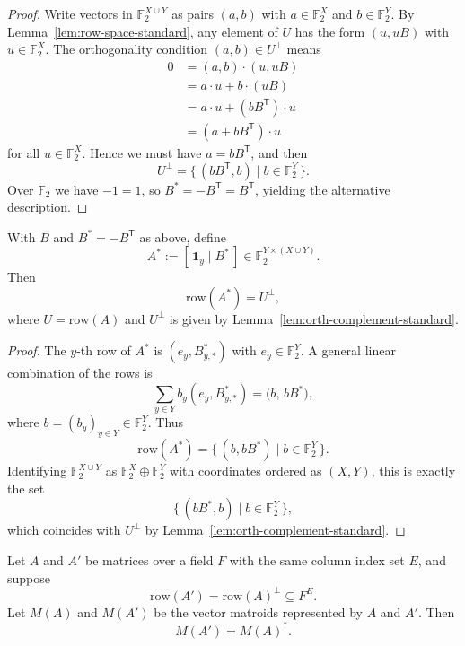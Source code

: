 \begin{proof}
    Write vectors in $\mathbb{F}_2^{X \cup Y}$ as pairs $(a,b)$ with
    $a \in \mathbb{F}_2^X$ and $b \in \mathbb{F}_2^Y$.
    By Lemma~\ref{lem:row-space-standard}, any element of $U$ has the form
    $(u, uB)$ with $u \in \mathbb{F}_2^X$.
    The orthogonality condition $(a,b) \in U^\perp$ means
    \begin{align*}
      0 &= (a,b) \cdot (u, uB) \\ 
        &= a \cdot u + b \cdot (uB) \\
        &= a \cdot u + (b B^{\mathsf T}) \cdot u \\
        &= (a + b B^{\mathsf T}) \cdot u
    \end{align*}
    for all $u \in \mathbb{F}_2^X$.
    Hence we must have $a = b B^{\mathsf T}$, and then
    \[
      U^\perp = \{\, (b B^{\mathsf T}, b) \mid b \in \mathbb{F}_2^Y \,\}.
    \]
    Over $\mathbb{F}_2$ we have $-1 = 1$, so $B^* = -B^{\mathsf T} = B^{\mathsf T}$,
    yielding the alternative description.
\end{proof}

\begin{lemma}
    \label{lem:row-space-dual-standard}
    With $B$ and $B^* = -B^{\mathsf T}$ as above, define
    \[A^* := [\, \mathbf{1}_y \mid B^* \,] \in \mathbb{F}_2^{Y \times (X \cup Y)}.\]
    Then
    \[\text{row}(A^*) = U^\perp,\]
    where $U = \text{row}(A)$ and $U^\perp$ is given by
    Lemma~\ref{lem:orth-complement-standard}.
\end{lemma}

\begin{proof}
    The $y$-th row of $A^*$ is $(e_y, B^*_{y,*})$ with $e_y \in \mathbb{F}_2^Y$.
    A general linear combination of the rows is
    \[\sum_{y \in Y} b_y (e_y, B^*_{y,*}) = \bigl( b,\, b B^* \bigr),
    \]
    where $b = (b_y)_{y \in Y} \in \mathbb{F}_2^Y$.
    Thus
    \[\text{row}(A^*) = \{\, (b, b B^*) \mid b \in \mathbb{F}_2^Y \,\}.\]
    Identifying $\mathbb{F}_2^{X \cup Y}$ as $\mathbb{F}_2^X \oplus \mathbb{F}_2^Y$
    with coordinates ordered as $(X, Y)$, this is exactly the set
    \[\{\, (b B^*, b) \mid b \in \mathbb{F}_2^Y \,\},\]
    which coincides with $U^\perp$ by Lemma~\ref{lem:orth-complement-standard}.
\end{proof}

\begin{lemma}
    \label{lem:dual-vectormatroid-orth}
    Let $A$ and $A'$ be matrices over a field $F$ with the same column index set $E$,
    and suppose
    \[\text{row}(A') = \text{row}(A)^{\perp} \subseteq F^{E}.\]
    Let $M(A)$ and $M(A')$ be the vector matroids represented by $A$ and $A'$. Then
    \[M(A') = M(A)^{*}.\]
\end{lemma}


